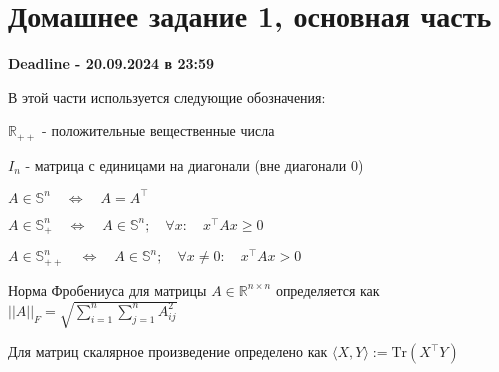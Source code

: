 \documentclass[a5paper,twoside,russian,8pt]{article}
\begin{document}

\section{Домашнее задание 1, основная часть}

\begin{center}
    \textbf{Deadline - 20.09.2024 в 23:59}
\end{center}

В этой части используется следующие обозначения:

$\mathbb{R}_{++}$ - положительные вещественные числа

$I_n$ - матрица с единицами на диагонали (вне диагонали 0)

$A \in \mathbb{S}^n \quad\Longleftrightarrow \quad A= A^\top$

$A \in \mathbb{S}^n_+ \quad\Longleftrightarrow \quad A \in \mathbb{S}^n ; \quad  \forall x: \quad  x^\top Ax \geq 0$

$A \in \mathbb{S}^n_{++}\quad \Longleftrightarrow \quad A \in \mathbb{S}^n ; \quad \forall x \neq 0: \quad  x^\top Ax > 0$

Норма Фробениуса для матрицы $A \in \mathbb{R}^{n \times n}$ определяется как $||A||_F = \sqrt{\sum_{i=1}^n \sum_{j=1}^n A^2_{ij}}$

Для матриц скалярное произведение определено как $\langle X, Y \rangle := \text{Tr}(X^\top Y)$
\end{document}
